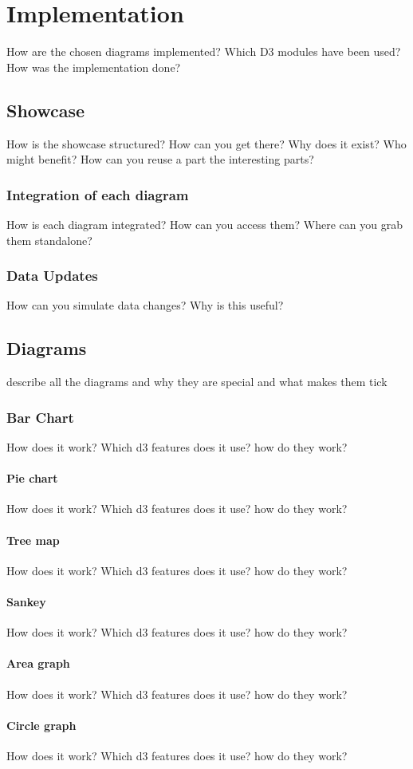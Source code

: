 \chapter{Implementation}
How are the chosen diagrams implemented? Which D3 modules have been used? How was the implementation done?

\section{Showcase}
How is the showcase structured? How can you get there? Why does it exist? Who might benefit? How can you reuse a part the interesting parts?

\subsection{Integration of each diagram}
How is each diagram integrated? How can you access them? Where can you grab them standalone?

\subsection{Data Updates}
How can you simulate data changes? Why is this useful?

\section{Diagrams}
describe all the diagrams and why they are special and what makes them tick

\subsection{Bar Chart}
How does it work? Which d3 features does it use? how do they work?

\subsubsection{Pie chart}
How does it work? Which d3 features does it use? how do they work?

\subsubsection{Tree map}
How does it work? Which d3 features does it use? how do they work?

\subsubsection{Sankey}
How does it work? Which d3 features does it use? how do they work?

\subsubsection{Area graph}
How does it work? Which d3 features does it use? how do they work?

\subsubsection{Circle graph}
How does it work? Which d3 features does it use? how do they work?
